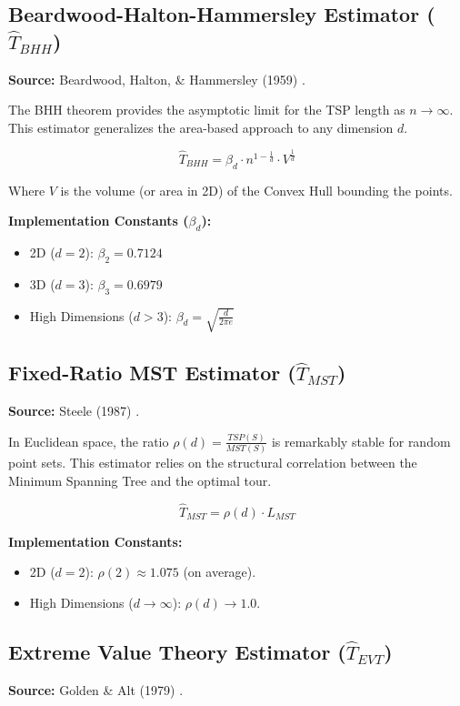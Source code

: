\documentclass{article}
\begin{document}
\subsection{Beardwood-Halton-Hammersley Estimator ($\hat{T}_{BHH}$)}
\textbf{Source:} Beardwood, Halton, \& Hammersley (1959) \cite{beardwood1959}.

The BHH theorem provides the asymptotic limit for the TSP length as $n \to \infty$. This estimator generalizes the area-based approach to any dimension $d$.

\begin{equation}
    \hat{T}_{BHH} = \beta_d \cdot n^{1 - \frac{1}{d}} \cdot V^{\frac{1}{d}}
\end{equation}

\noindent Where $V$ is the volume (or area in 2D) of the Convex Hull bounding the points.

\noindent \textbf{Implementation Constants ($\beta_d$):}
\begin{itemize}
    \item 2D ($d=2$): $\beta_2 = 0.7124$
    \item 3D ($d=3$): $\beta_3 = 0.6979$
    \item High Dimensions ($d > 3$): $\beta_d = \sqrt{\frac{d}{2\pi e}}$
\end{itemize}

\subsection{Fixed-Ratio MST Estimator ($\hat{T}_{MST}$)}
\textbf{Source:} Steele (1987) \cite{steele1987}.

In Euclidean space, the ratio $\rho(d) = \frac{TSP(S)}{MST(S)}$ is remarkably stable for random point sets. This estimator relies on the structural correlation between the Minimum Spanning Tree and the optimal tour.

\begin{equation}
    \hat{T}_{MST} = \rho(d) \cdot L_{MST}
\end{equation}

\noindent \textbf{Implementation Constants:}
\begin{itemize}
    \item 2D ($d=2$): $\rho(2) \approx 1.075$ (on average).
    \item High Dimensions ($d \to \infty$): $\rho(d) \to 1.0$.
\end{itemize}

\subsection{Extreme Value Theory Estimator ($\hat{T}_{EVT}$)}
\textbf{Source:} Golden \& Alt (1979) \cite{golden1979}.
\end{document}
